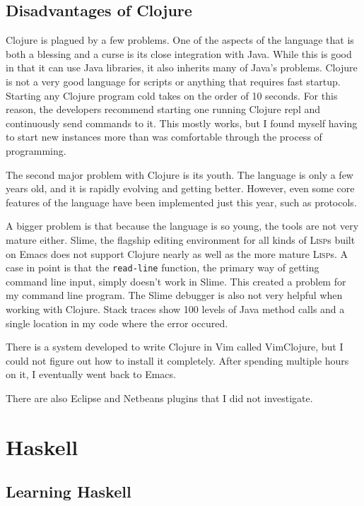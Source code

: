 \documentclass{article}
\begin{document}
\subsection{Disadvantages of Clojure}

Clojure is plagued by a few problems.  One of the aspects of the language that
is both a blessing and a curse is its close integration with Java.  While this
is good in that it can use Java libraries, it also inherits many of Java's
problems.  Clojure is not a very good language for scripts or anything that
requires fast startup.  Starting any Clojure program cold takes on the order of
10 seconds.  For this reason, the developers recommend starting one running
Clojure repl and continuously send commands to it.  This mostly works, but I
found myself having to start new instances more than was comfortable through the
process of programming.

The second major problem with Clojure is its youth.  The language is only
a few years old, and it is rapidly evolving and getting better.  However, even
some core features of the language have been implemented just this year, such as
protocols.

A bigger problem is that because the language is so young, the tools are not
very mature either.  Slime, the flagship editing environment for all kinds of
\textsc{Lisp}s built on Emacs does not support Clojure nearly as well as the more mature
\textsc{Lisp}s.  A case in point is that the \texttt{read-line} function, the primary way of
getting command line input, simply doesn't work in Slime.  This created a
problem for my command line program.  The Slime debugger is also not very
helpful when working with Clojure.  Stack traces show 100 levels of Java
method calls and a single location in my code where the error occured.

There is a system developed to write Clojure in Vim called VimClojure, but I
could not figure out how to install it completely.  After spending multiple
hours on it, I eventually went back to Emacs.

There are also Eclipse and Netbeans plugins that I did not investigate.

\section{Haskell}

\subsection{Learning Haskell}
\end{document}
